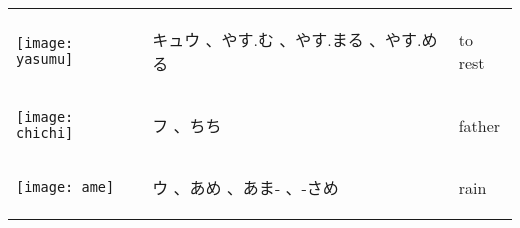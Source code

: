 \documentclass[a4paper,12pt]{extarticle}
\begin{document}
\begin{longtable}{|lp{6cm}p{4cm}|}
	\begin{minipage}{0.3\textwidth}
		\centerline{
			\texttt{[image: yasumu]}
		}
	\end{minipage}
	                                   &
	\begin{CJK}{UTF8}{min} キュウ 、やす.む 、やす.まる 、やす.める\end{CJK}
	                                   &
	to rest
	\\
	\begin{minipage}{0.3\textwidth}
		\centerline{
			\texttt{[image: chichi]}
		}
	\end{minipage}
	                                   &
	\begin{CJK}{UTF8}{min}フ 、ちち\end{CJK}
	                                   &
	father
	\\
	\begin{minipage}{0.3\textwidth}
		\centerline{
			\texttt{[image: ame]}
		}
	\end{minipage}
	                                   &
	\begin{CJK}{UTF8}{min} ウ 、あめ 、あま- 、-さめ\end{CJK}
	                                   &
	rain
	\\
\end{longtable}
\end{document}
